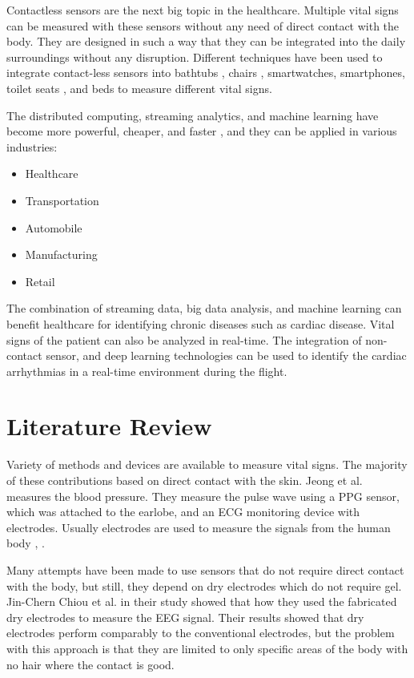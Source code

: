 Contactless sensors are the next big topic in the healthcare. Multiple vital signs can be measured with these sensors without any need of direct contact with the body. They are designed in such a way that they can be integrated into the daily surroundings without any disruption. Different techniques have been used to integrate contact-less sensors into bathtubs \cite{lim2004ecg}, chairs \cite{aleksandrowicz2007wireless}, smartwatches, smartphones, toilet seats \cite{kim2004electrically}, and beds \cite{wu2008contactless} to measure different vital signs. 

The distributed computing, streaming analytics, and machine learning have become more powerful, cheaper, and faster \cite{maprmliotmed}, and they can be applied in various industries:

\begin{itemize}
	\item Healthcare
	\item Transportation
	\item Automobile
	\item Manufacturing
	\item Retail
\end{itemize}


The combination of streaming data, big data analysis, and machine learning can benefit healthcare for identifying chronic diseases such as cardiac disease. Vital signs of the patient can also be analyzed in real-time. The integration of non-contact sensor, and deep learning technologies can be used to identify the cardiac arrhythmias in a real-time environment during the flight.

\section{Literature Review}

Variety of methods and devices are available to measure vital signs. The majority of these contributions based on direct contact with the skin. Jeong et al. \cite{jeong2005continuous} measures the blood pressure. They measure the pulse wave using a PPG sensor, which was attached to the earlobe, and an ECG monitoring device with electrodes. Usually electrodes are used to measure the signals from the human body \cite{shen2007detection}, \cite{neuman1998biopotential}.

Many attempts have been made to use sensors that do not require direct contact with the body, but still, they depend on dry electrodes which do not require gel. Jin-Chern Chiou et al. in their study \cite{4600301} showed that how they used the fabricated dry electrodes to measure the EEG signal. Their results showed that dry electrodes perform comparably to the conventional electrodes, but the problem with this approach is that they are limited to only specific areas of the body with no hair where the contact is good.

